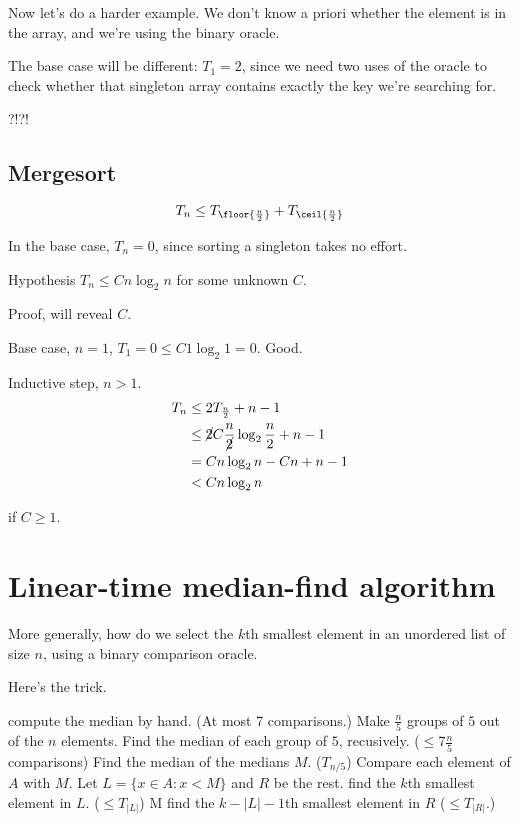 \documentclass{article}
\begin{document}
Now let's do a harder example. We don't know a priori whether the element is in the array, and we're using the binary oracle.

The base case will be different: $T_1 = 2$, since we need two uses of the oracle to check whether that singleton array contains exactly the key we're searching for.

?!?!

\subsection{Mergesort}

$$
T_n \leq T_{\floor{\frac{n}{2}}} + T_{\ceil{\frac{n}{2}}}
$$

In the base case, $T_n = 0$, since sorting a singleton takes no effort.

Hypothesis $T_n \leq C n \log_2{n}$ for some unknown $C$.

Proof, will reveal $C$.

Base case, $n=1$, $T_1 = 0 \leq C 1 \log_2{1} = 0$. Good.

Inductive step, $n>1$.
\begin{align*}
    T_n &\leq 2 T_{\frac{n}{2}} + n - 1 \\
        &\leq \cancel{2} C \frac{n}{\cancel{2}} \log_2{\frac{n}{2}} + n - 1 \\
        &= C n \log_2 n - Cn + n - 1 \\
        &< C n \log_2 n
\end{align*}

if $C \geq 1$.

\section{Linear-time median-find algorithm}

More generally, how do we select the $k$th smallest element in an unordered list of size $n$, using a binary comparison oracle.

Here's the trick.

\begin{algorithm}
    \begin{algorithmic}
            \State compute the median by hand. (At most 7 comparisons.)
        \Else
            \State Make $\frac{n}{5}$ groups of $5$ out of the $n$ elements.
            \State Find the median of each group of $5$, recusively. ($\leq 7\frac{n}{5}$ comparisons)
            \State Find the median of the medians $M$. ($T_{n/5}$)
            \State Compare each element of $A$ with $M$.
            \State Let $L = \{x \in A : x < M\}$ and $R$ be the rest.
                \State find the $k$th smallest element in $L$. ($\leq T_{|L|}$)
                \State \Return M
            \Else
            \State find the $k - |L| - 1$th smallest element in $R$ ($\leq T_{|R|}$.)
            \EndIf
        \EndIf
    \end{algorithmic}
\end{algorithm}
\end{document}
